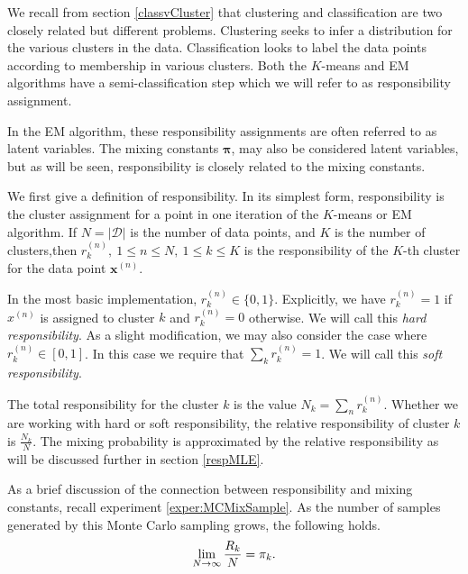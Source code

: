 We recall from section \ref{classvCluster} that clustering and classification are two closely 
related but different problems. Clustering seeks to infer a distribution for 
the various clusters in the data. Classification looks to label the data 
points according to membership in various clusters. Both the $K$-means and EM 
algorithms have a semi-classification step which we will refer to as 
responsibility assignment. \cite{BishopBook,MML_2019}

In the EM algorithm, these responsibility assignments are often referred to as 
latent variables. The mixing constants $\bm\pi$, may also be considered latent 
variables, but as will be seen, responsibility is closely related to the 
mixing constants.

We first give a definition of responsibility.  In its simplest form, 
responsibility is the cluster assignment for a point in one iteration of the 
$K$-means or EM algorithm. If $N = |\mathcal{D}|$ is the number of data 
points, and  $K$ is the number of clusters,then 
$r^{(n)}_k,\ 1\leq n\leq N,\ 1\leq k\leq K$ is the responsibility of the 
$K$-th cluster for the data point $\bm x^{(n)}$.  

In the most basic implementation, $r^{(n)}_k \in \{0,1\}$. Explicitly, we have 
$r^{(n)}_k=1$ if $x^{(n)}$ is assigned to cluster $k$ and $r^{(n)}_k = 0$ 
otherwise. We will call this \textit{hard responsibility}. As a slight 
modification, we may also consider the case where $r^{(n)}_k \in [0,1]$. In 
this case we require that $\sum_k r^{(n)}_k = 1$. We will call this 
\textit{soft responsibility}.
 
The total responsibility for the cluster $k$ is the value 
$N_k = \sum_n r^{(n)}_k$.
Whether we are working with hard or soft responsibility, the relative 
responsibility of cluster $k$ is $\frac{N_k}{N}$.  The mixing probability is 
approximated by the relative responsibility as will be discussed further in 
section \ref{respMLE}.

As a brief discussion of the connection between responsibility and mixing 
constants, recall experiment \ref{exper:MCMixSample}.   
As the number of samples generated by this Monte Carlo sampling grows, the following holds. \[\lim_{N\rightarrow\infty}\frac{R_k}{N} = \pi_k.\] 

